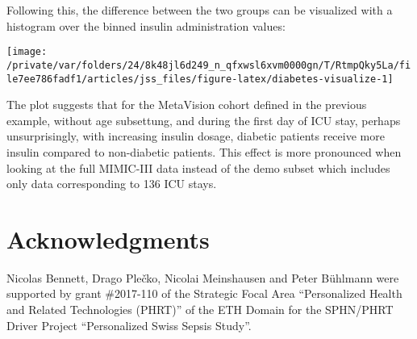 \documentclass[
  notitle]{jss}
\begin{document}
Following this, the difference between the two groups can be visualized
with a histogram over the binned insulin administration values:

\begin{CodeChunk}


\begin{center}\texttt{[image: /private/var/folders/24/8k48jl6d249\_n\_qfxwsl6xvm0000gn/T/RtmpQky5La/file7ee786fadf1/articles/jss\_files/figure-latex/diabetes-visualize-1]} \end{center}

\end{CodeChunk}

The plot suggests that for the MetaVision cohort defined in the previous
example, without age subsettung, and during the first day of ICU stay,
perhaps unsurprisingly, with increasing insulin dosage, diabetic
patients receive more insulin compared to non-diabetic patients. This
effect is more pronounced when looking at the full MIMIC-III data
instead of the demo subset which includes only data corresponding to 136
ICU stays.

\hypertarget{acknowledgments}{%
\section{Acknowledgments}\label{acknowledgments}}

Nicolas Bennett, Drago Plečko, Nicolai Meinshausen and Peter Bühlmann
were supported by grant \#2017-110 of the Strategic Focal Area
``Personalized Health and Related Technologies (PHRT)'' of the ETH
Domain for the SPHN/PHRT Driver Project ``Personalized Swiss Sepsis
Study''.


\end{document}
